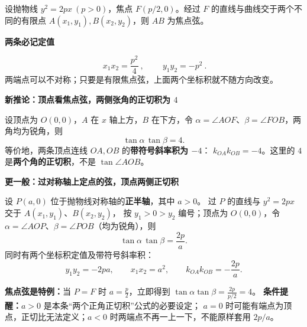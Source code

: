 \begin{statementbox}
设抛物线 $y^2=2px\ (p>0)$，焦点 $F(p/2,0)$。经过 $F$ 的直线与曲线交于两个不同的有限点 $A(x_1,y_1),B(x_2,y_2)$，则 $AB$ 为焦点弦。
\begin{center}\end{center}

\medskip
\textbf{\textcolor{CStatement}{两条必记定值}}\par\smallskip
\[
 \boxed{\ x_1x_2=\frac{p^2}{4}\ },\qquad
 \boxed{\ y_1y_2=-p^2\ }.
\]
两端点可以不对称；只要是有限焦点弦，上面两个坐标积就不随方向改变。

\end{statementbox}
\clearpage
\begin{statementbox}
\textbf{\textcolor{CStatement}{新推论：顶点看焦点弦，两侧张角的正切积为 $4$}}\par\smallskip
\begin{center}\end{center}
设顶点为 $O(0,0)$，$A$ 在 $x$ 轴上方，$B$ 在下方，令
$\alpha=\angle AOF$、$\beta=\angle FOB$，两角均为锐角，则
\[
 \boxed{\tan\alpha\,\tan\beta=4}.
\]
等价地，两条顶点连线 $OA,OB$ 的\textbf{带符号斜率积为 $-4$}：
$k_{OA}k_{OB}=-4$。这里的 $4$ 是\textbf{两个角的正切积}，不是 $\tan\angle AOB$。
\end{statementbox}
\clearpage
\begin{statementbox}
\textbf{\textcolor{CStatement}{更一般：过对称轴上定点的弦，顶点两侧正切积}}\par\smallskip
设 $P(a,0)$ 位于抛物线对称轴的\textbf{正半轴}，其中 $a>0$。
过 $P$ 的直线与 $y^2=2px$ 交于 $A(x_1,y_1)$、$B(x_2,y_2)$，
按 $y_1>0>y_2$ 编号；顶点为 $O(0,0)$，令
$\alpha=\angle AOP$、$\beta=\angle POB$（均为锐角），则
\[
 \boxed{\tan\alpha\,\tan\beta=\frac{2p}{a}}.
\]
同时有两个坐标积定值及带符号斜率积：
\[
 \boxed{y_1y_2=-2pa},\qquad
 \boxed{x_1x_2=a^2},\qquad
 \boxed{k_{OA}k_{OB}=-\frac{2p}{a}}.
\]
\begin{center}\end{center}
\textbf{焦点弦是特例：}当 $P=F$ 时 $a=\frac p2$，立即得到
$\tan\alpha\tan\beta=\frac{2p}{p/2}=\boxed{4}$。
\textbf{条件提醒：}$a>0$ 是本条“两个正角正切积”公式的必要设定；
$a=0$ 时可能有端点为顶点，正切比无法定义；$a<0$ 时两端点不再一上一下，不能原样套用 $2p/a$。
\end{statementbox}
\clearpage
